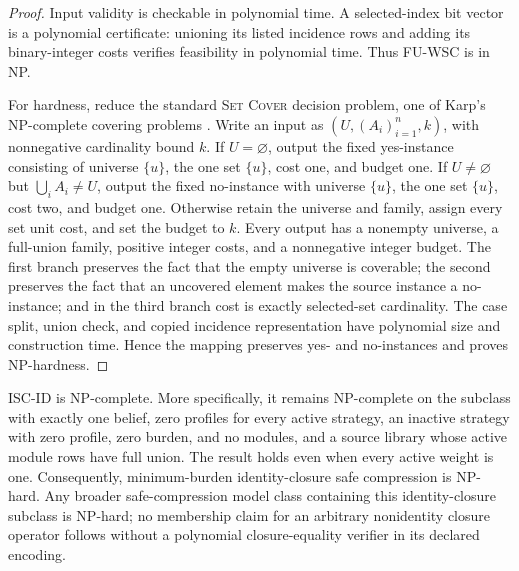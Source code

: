 \begin{proof}
Input validity is checkable in polynomial time. A selected-index bit vector is
a polynomial certificate: unioning its listed incidence rows and adding its
binary-integer costs verifies feasibility in polynomial time. Thus
\textsc{FU-WSC} is in NP.

For hardness, reduce the standard \textsc{Set Cover} decision problem, one of
Karp's NP-complete covering problems \citep{Karp1972}. Write an input as
$(U,(A_i)_{i=1}^n,k)$, with nonnegative cardinality bound $k$. If
$U=\varnothing$, output the fixed yes-instance consisting of universe
$\{u\}$, the one set $\{u\}$, cost one, and budget one. If
$U\neq\varnothing$ but $\bigcup_i A_i\neq U$, output the fixed no-instance
with universe $\{u\}$, the one set $\{u\}$, cost two, and budget one.
Otherwise retain the universe and family, assign every set unit cost, and set
the budget to $k$. Every output has a nonempty universe, a full-union family,
positive integer costs, and a nonnegative integer budget. The first branch
preserves the fact that the empty universe is coverable; the second preserves
the fact that an uncovered element makes the source instance a no-instance;
and in the third branch cost is exactly selected-set cardinality. The case
split, union check, and copied incidence representation have polynomial size
and construction time. Hence the mapping preserves yes- and no-instances and
proves NP-hardness.
\end{proof}

\begin{theorem}
\label{thm:aor-safe-compression-complexity}
\textnormal{\textsc{ISC-ID}} is NP-complete. More specifically, it remains
NP-complete on
the subclass with exactly one belief, zero profiles for every active strategy,
an inactive strategy with zero profile, zero burden, and no modules, and a
source library whose active module rows have full union. The result holds even
when every active weight is one. Consequently, minimum-burden identity-closure
safe compression is NP-hard. Any broader safe-compression model class
containing this identity-closure subclass is NP-hard; no membership claim for
an arbitrary nonidentity closure operator follows without a polynomial
closure-equality verifier in its declared encoding.
\end{theorem}

